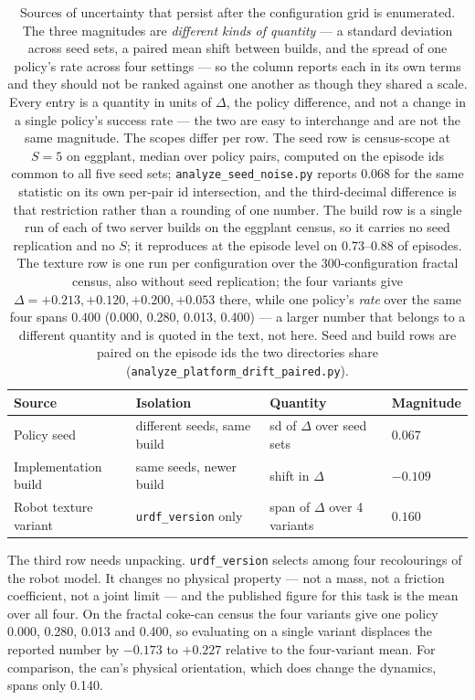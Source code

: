 \documentclass[pdflatex,iicol,sn-apa]{sn-jnl}
\theoremstyle{remark}
\begin{document}
\begin{table}[t]
\caption{Sources of uncertainty that persist after the configuration grid is enumerated. The three
magnitudes are \emph{different kinds of quantity} --- a standard deviation across seed sets, a paired
mean shift between builds, and the spread of one policy's rate across four settings --- so the column
reports each in its own terms and they should not be ranked against one another as though they shared
a scale. Every entry is a quantity in units of $\Delta$, the policy difference, and not a change in a
single policy's success rate --- the two are easy to interchange and are not the same magnitude.
The scopes differ per row. The seed row
is census-scope at $S = 5$ on eggplant, median over policy pairs, computed on the episode ids common
to all five seed sets; \texttt{analyze\_seed\_noise.py} reports $0.068$ for the same statistic on its
own per-pair id intersection, and the third-decimal difference is that restriction rather than a
rounding of one number. The build row is a single run of
each of two server builds on the eggplant census, so it carries no seed replication and no $S$; it
reproduces at the episode level on 0.73--0.88 of episodes. The texture row is one run per
configuration over the 300-configuration fractal census, also without seed replication; the four
variants give $\Delta = +0.213, +0.120, +0.200, +0.053$ there, while one policy's \emph{rate} over
the same four spans $0.400$ (0.000, 0.280, 0.013, 0.400) --- a larger number that belongs to a
different quantity and is quoted in the text, not here. Seed and build rows are paired on the
episode ids the two directories share
(\texttt{analyze\_platform\_drift\_paired.py}).}\label{tab3}
\begin{tabular}{@{}llll@{}}
\toprule
Source & Isolation & Quantity & Magnitude \\
\midrule
Policy seed & different seeds, same build & sd of $\Delta$ over seed sets & $0.067$ \\
Implementation build & same seeds, newer build & shift in $\Delta$ & $-0.109$ \\
Robot texture variant & \texttt{urdf\_version} only & span of $\Delta$ over 4 variants & $0.160$ \\
\bottomrule
\end{tabular}
\end{table}

The third row needs unpacking. \texttt{urdf\_version} selects among four recolourings of the robot
model. It changes no physical property --- not a mass, not a friction coefficient, not a joint limit
--- and the published figure for this task is the mean over all four. On the fractal coke-can census
the four variants give one policy 0.000, 0.280, 0.013 and 0.400, so evaluating on a single variant
displaces the reported number by $-0.173$ to $+0.227$ relative to the four-variant mean. For
comparison, the can's physical orientation, which does change the dynamics, spans only 0.140.
\end{document}
